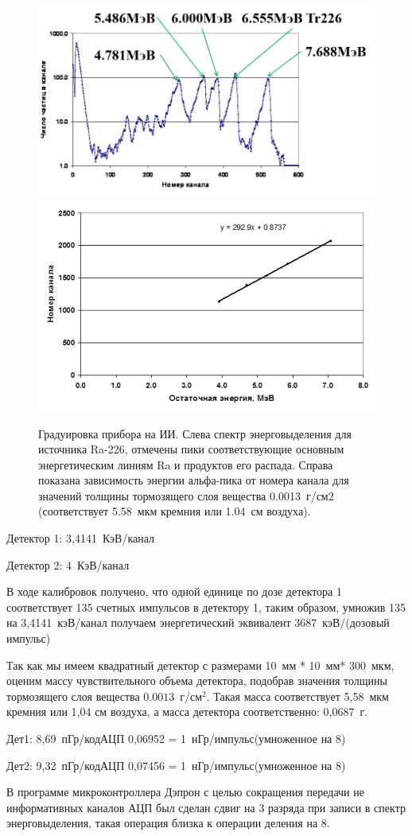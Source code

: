 \begin{figure}
	\centering
	\includegraphics[width=0.49\linewidth]{images/kalibr2}
	\includegraphics[width=0.49\linewidth]{images/kalibr3}
	\caption[Градуировка прибора на ИИ]{Градуировка прибора на ИИ. Слева спектр энерговыделения для источника Ra-226, отмечены пики соответствующие основным энергетическим линиям Ra и продуктов его распада. Справа показана зависимость энергии альфа-пика от номера канала для значений толщины тормозящего слоя вещества 0.0013~г/см2 (соответствует 5.58~мкм кремния или 1.04~см воздуха).	}
	\label{fig:kalibr2}
\end{figure}
Детектор 1: 3,4141~КэВ/канал 

Детектор 2: 4~КэВ/канал %

В ходе калибровок получено, что одной единице по дозе детектора 1 соответствует 135 счетных импульсов в детектору 1, таким образом, умножив 135 на 3,4141~кэВ/канал  получаем энергетический эквивалент 3687~кэВ/(дозовый импульс) 

Так как мы имеем квадратный детектор с размерами 10~мм * 10~мм* 300~мкм, оценим массу чувствительного объема детектора, подобрав значения толщины тормозящего слоя вещества $ 0.0013$~г/см$^2$. Такая масса соответствует 5,58~мкм кремния или 1,04 см воздуха, а масса детектора соответственно: 0,0687~г.

Дет1: 8,69~пГр/кодАЦП  0,06952 = 1~нГр/импульс(умноженное на 8)

Дет2: 9,32~пГр/кодАЦП  0,07456 = 1~нГр/импульс(умноженное на 8)


В программе микроконтроллера Дэпрон с целью сокращения передачи не информативных  каналов АЦП был сделан сдвиг на 3 разряда при записи в спектр энерговыделения, такая операция близка к операции деления на 8.

